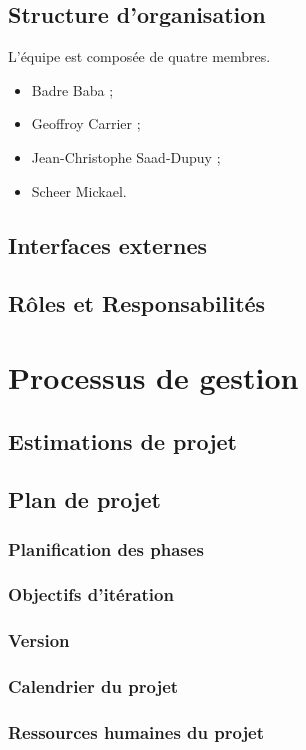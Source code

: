 \documentclass[a4paper,10pt,twoside]{article}
\begin{document}
\subsection{Structure d’organisation}
L'équipe est composée de quatre membres.
\begin{itemize}
	\item Badre Baba ;
	\item Geoffroy Carrier ;
	\item Jean-Christophe Saad-Dupuy ;
	\item Scheer Mickael.
\end{itemize}

\subsection{Interfaces externes}
\subsection{Rôles et Responsabilités}


\section{Processus de gestion}
\subsection{Estimations de projet}

\subsection{Plan de projet}
\subsubsection{Planification des phases}
\subsubsection{Objectifs d’itération}
\subsubsection{Version}
\subsubsection{Calendrier du projet}
\subsubsection{Ressources humaines du projet}
\end{document}
